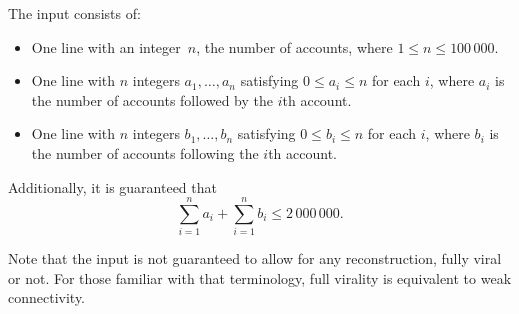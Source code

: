 

The input consists of:
\begin{itemize}
\item
One line with an integer~$n$, the number of accounts, where $1 \leq n \leq 100\,000$.
\item
 One line with $n$ integers $a_1,\ldots, a_n$ satisfying $0 \leq a_i \leq n$ for each $i$,
 where $a_i$ is the number of accounts followed by the $i$th account.
\item
 One line with $n$ integers $b_1,\ldots, b_n$ satisfying $0 \leq b_i \leq n$ for each  $i$,
 where $b_i$ is the number of accounts following the $i$th account.
\end{itemize}

Additionally, it is guaranteed that 
\[
    \sum_{i=1}^n a_i + \sum_{i=1}^n b_i \leq 2\,000\,000.
\]

Note that the input is not guaranteed to allow for any reconstruction, fully viral or not.
For those familiar with that terminology, full virality is equivalent to weak connectivity.

